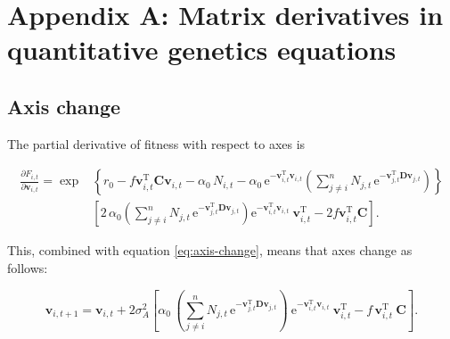 
\renewcommand{\thefigure}{A\arabic{figure}}
\renewcommand{\theequation}{A\arabic{equation}}
\renewcommand{\thetable}{A\arabic{table}}
\setcounter{equation}{0}
\setcounter{figure}{0}
\setcounter{table}{0}


\section*{Appendix A: Matrix derivatives in quantitative genetics equations}


\subsection*{Axis change}

The partial derivative of fitness with respect to axes is

\begin{equation*}
\begin{split}
    \frac{ \partial F_{i,t} }{ \partial \mathbf{v}_{i,t} } =
        \exp & \left\{
            r_0
            - f \mathbf{v}_{i,t}^{\textrm{T}} \mathbf{C} \mathbf{v}_{i,t}
            - \alpha_0 \, N_{i,t}
            - \alpha_0 \,
                \textrm{e}^{- \mathbf{v}_{i,t}^{\textrm{T}} \mathbf{v}_{i,t}}
            \left(
                \sum_{j \ne i}^{n}{ N_{j,t} \, \textrm{e}^{
                - \mathbf{v}_{j,t}^{\textrm{T}}
                \mathbf{D} \mathbf{v}_{j,t} } }
            \right)
        \right\} \\
        & \left[
            2 \, \alpha_0 \left(
                \sum_{j \ne i}^{n}{ N_{j,t} \, \textrm{e}^{
                - \mathbf{v}_{j,t}^{\textrm{T}}
                \mathbf{D} \mathbf{v}_{j,t} } }
            \right)
                \textrm{e}^{- \mathbf{v}_{i,t}^{\textrm{T}} \mathbf{v}_{i,t}} \:
                \mathbf{v}_{i,t}^{\textrm{T}}
            - 2 f \mathbf{v}_{i,t}^{\textrm{T}} \mathbf{C}
        \right]
    \textrm{.}
\end{split}
\end{equation*}


This, combined with equation \ref{eq:axis-change}, means that axes change as follows:

\begin{equation} \label{eq:axes-change-full}
    \mathbf{v}_{i,t+1} = \mathbf{v}_{i,t} + 2 \sigma_A^2
    \left[
        \alpha_0 \, \left(
            \sum_{j \ne i}^{n}{ N_{j,t} \, \textrm{e}^{
            - \mathbf{v}_{j,t}^{\textrm{T}}
            \mathbf{D} \mathbf{v}_{j,t} } }
        \right) \:
            \textrm{e}^{- \mathbf{v}_{i,t}^{\textrm{T}} \mathbf{v}_{i,t}} \:
            \mathbf{v}_{i,t}^{\textrm{T}}
        - f \, \mathbf{v}_{i,t}^{\textrm{T}} \: \mathbf{C}
    \right]
    \textrm{.}
\end{equation}


